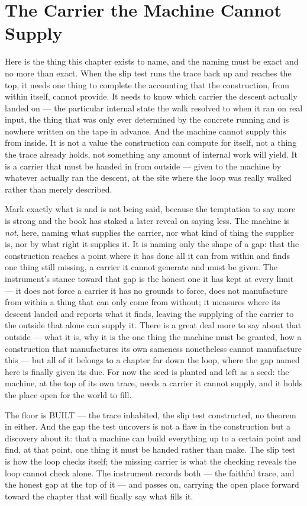 \section{The Carrier the Machine Cannot Supply}

Here is the thing this chapter exists to name, and the naming must be exact and no more than exact. When the slip
test runs the trace back up and reaches the top, it needs one thing to complete the accounting that the
construction, from within itself, cannot provide. It needs to know which carrier the descent actually landed on
--- the particular internal state the walk resolved to when it ran on real input, the thing that was only ever
determined by the concrete running and is nowhere written on the tape in advance. And the machine cannot supply
this from inside. It is not a value the construction can compute for itself, not a thing the trace already holds,
not something any amount of internal work will yield. It is a carrier that must be handed in from outside --- given
to the machine by whatever actually ran the descent, at the site where the loop was really walked rather than
merely described.

Mark exactly what is and is not being said, because the temptation to say more is strong and the book has staked a
later reveal on saying less. The machine is \emph{not}, here, naming what supplies the carrier, nor what kind of
thing the supplier is, nor by what right it supplies it. It is naming only the shape of a gap: that the
construction reaches a point where it has done all it can from within and finds one thing still missing, a carrier
it cannot generate and must be given. The instrument's stance toward that gap is the honest one it has kept at
every limit --- it does not force a carrier it has no grounds to force, does not manufacture from within a thing
that can only come from without; it measures where its descent landed and reports what it finds, leaving the
supplying of the carrier to the outside that alone can supply it. There is a great deal more to say about that
outside --- what it is, why it is the one thing the machine must be granted, how a construction that manufactures
its own sameness nonetheless cannot manufacture this --- but all of it belongs to a chapter far down the loop,
where the gap named here is finally given its due. For now the seed is planted and left as a seed: the machine, at
the top of its own trace, needs a carrier it cannot supply, and it holds the place open for the world to fill.

The floor is BUILT --- the trace inhabited, the slip test constructed, no theorem in either. And the gap the test
uncovers is not a flaw in the construction but a discovery about it: that a machine can build everything up to a
certain point and find, at that point, one thing it must be handed rather than make. The slip test is how the
loop checks itself; the missing carrier is what the checking reveals the loop cannot check alone. The instrument
records both --- the faithful trace, and the honest gap at the top of it --- and passes on, carrying the open
place forward toward the chapter that will finally say what fills it.
